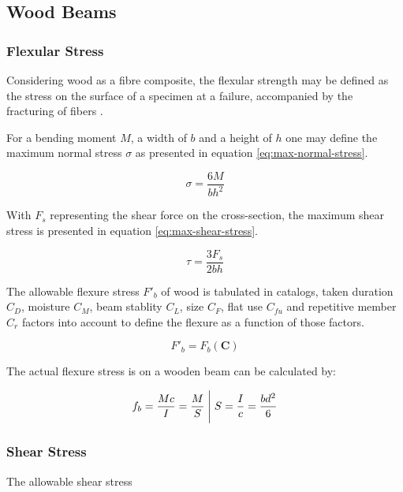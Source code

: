 \subsection{Wood Beams}

\subsubsection{Flexular Stress}

Considering wood as a fibre composite, the flexular strength may be defined as
the stress on the surface of a specimen at a failure, accompanied by the
fracturing of fibers
\cite[chapter 7.2]{hodgikinson-mech-testing-fibre-composites}.

\begin{tikzpicture}

\end{tikzpicture}

For a bending moment $M$, a width of $b$ and a height of $h$ one may define
the maximum normal stress $\sigma$ as presented in equation
\ref{eq:max-normal-stress}.

\begin{equation}\label{eq:max-normal-stress}
\sigma = \frac{6M}{bh^2}
\end{equation}

With $F_s$ representing the shear force on the cross-section, the maximum shear
stress is presented in equation \ref{eq:max-shear-stress}.

\begin{equation}\label{eq:max-shear-stress}
\tau = \frac{3F_s}{2bh}
\end{equation}

The allowable flexure stress $F'_b$ of wood is tabulated in catalogs, taken
duration $C_D$, moisture $C_M$, beam stablity $C_L$, size $C_F$,
flat use $C_{fu}$ and repetitive member $C_r$ factors into account to define
the flexure as a function of those factors.

\begin{equation}
F'_{b} = F_b(\mathbf C)
\end{equation}

The actual flexure stress is on a wooden beam can be calculated by:

\begin{equation}
f_b = \frac{Mc}{I} = \frac{M}{S} \Biggm\lvert S = \frac{I}{c} = \frac{bd^2}{6}
\end{equation}

\subsubsection{Shear Stress}
The allowable shear stress

